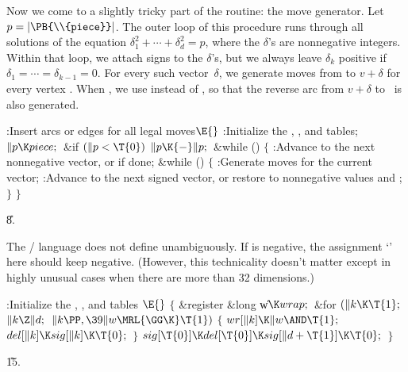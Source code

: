 Now we come to a slightly tricky part of the routine: the move generator.
Let $p=\vert\PB{\\{piece}}\vert$. The outer loop of this procedure runs through
all
solutions of the equation $\delta_1^2+\cdots+\delta_d^2=p$, where the
$\delta$'s are nonnegative integers. Within that loop, we attach signs
to the $\delta$'s, but we always leave $\delta_k$ positive if $\delta_1=
\cdots=\delta_{k-1}=0$. For every such vector~$\delta$, we generate moves
from  to $v+\delta$ for every vertex . When ,
we use  instead of , so that the
reverse arc
from $v+\delta$ to~ is also generated.

\Y\B\4:Insert arcs or edges for all legal moves\X${}\E{}$\6
:Initialize the , , and  tables\X;\6
${}\|p\K\\{piece};{}$\6
\&{if} ${}(\|p<\T{0}){}$\1\5
${}\|p\K{-}\|p;{}$\2\6
\&{while} ()\5
${}\{{}$\1\6
:Advance to the next nonnegative  vector, or  if
done\X;\6
\&{while} ()\5
${}\{{}$\1\6
:Generate moves for the current  vector\X;\6
:Advance to the next signed  vector, or restore  to
nonnegative values and \X;\6
\4${}\}{}$\2\6
\4${}\}{}$\2\par
\U8.\fi

The \CEE/ language does not define \PB{$\GG$} unambiguously. If 
is negative,
the assignment `' here should keep 
negative.
(However, this technicality doesn't matter except in highly unusual cases
when there are more than 32 dimensions.)

\Y\B\4:Initialize the , , and  tables%
\X${}\E{}$\6
${}\{{}$\5
\1\&{register} \&{long} \|w${}\K\\{wrap};{}$\7
\&{for} ${}(\|k\K\T{1};{}$ ${}\|k\Z\|d;{}$ ${}\|k\PP,\39\|w\MRL{{\GG}{\K}}%
\T{1}){}$\5
${}\{{}$\1\6
${}\\{wr}[\|k]\K\|w\AND\T{1};{}$\6
${}\\{del}[\|k]\K\\{sig}[\|k]\K\T{0};{}$\6
\4${}\}{}$\2\6
${}\\{sig}[\T{0}]\K\\{del}[\T{0}]\K\\{sig}[\|d+\T{1}]\K\T{0};{}$\6
\4${}\}{}$\2\par
\U15.\fi

